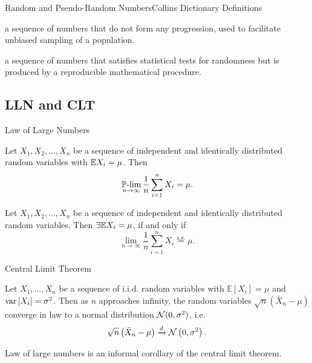     \begin{frame}{Random and Pseudo-Random Numbers}{Collins Dictionary Definitions}
        \begin{definition}
            a sequence of numbers that do not form any progression, used to facilitate unbiased sampling of a population.
        \end{definition}
        \begin{definition}
            a sequence of numbers that satisfies statistical tests for randomness but is produced by a reproducible mathematical procedure.
        \end{definition}
    \end{frame}

\subsection{LLN and CLT}
    \begin{frame}{Law of Large Numbers}
        \begin{theorem}[Khinchin]
            Let $X_1, X_2, \dots, X_n$ be a sequence of independent and identically distributed random variables with $\mathbb{E} X_i = \mu$. Then
            \begin{equation}
                \operatorname*{\operatorname{\mathbb{P}-lim}}_{n \to \infty} \frac{1}{n} \sum_{i=1}^n X_i = \mu.
            \end{equation}
        \end{theorem}
        \begin{theorem}[Kolmogorov]
            Let $X_1, X_2, \dots, X_n$ be a sequence of independent and identically distributed random variables. Then $\exists \mathbb{E} X_i = \mu$, if and only if
            \begin{equation}
                \lim_{n \to \infty} \frac{1}{n} \sum_{i=1}^n X_i \overset{\text{a.s.}}{=} \mu.
            \end{equation}
        \end{theorem}
    \end{frame}

    \begin{frame}{Central Limit Theorem}
        \begin{theorem}
            Let $X_1, \dots, X_n$ be a sequence of i.i.d. random variables with $\mathbb{E}[X_i] = \mu$ and $\operatorname*{var}\left[X_i\right] = \sigma^2$. 
            Then as $n$ approaches infinity, the random variables $\sqrt{n}(\bar{X}_n - \mu)$ converge in law to a normal distribution ${\cal N}(0, \sigma^2)$, i.e.
            \begin{equation}
                \sqrt{n}\left(\bar{X}_n - \mu\right) \xrightarrow{d} {\cal N}\left(0,\sigma^2\right).
            \end{equation}
        \end{theorem}
        \begin{nb}
            Law of large numbers is an informal corollary of the central limit theorem.
        \end{nb}
    \end{frame}

